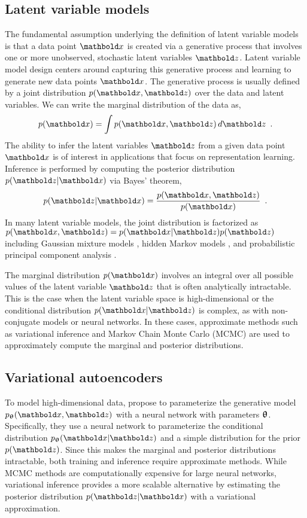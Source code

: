 \subsection{Latent variable models}
The fundamental assumption underlying the definition of latent variable models is that a data point $\xb$ is created via a generative process that involves one or more unobserved, stochastic latent variables  $\zb$. 
Latent variable model design centers around capturing this generative process and learning to generate new data points $\xb$. The generative process is usually defined by a joint distribution $p(\xb, \zb)$ over the data and latent variables. 
We can write the marginal distribution of the data as,
%
\begin{equation} \label{eq:latent-variable-model-marginal-distribution}
    p(\xb) = \int p(\xb,\zb) \, d\zb \enspace .
\end{equation}
%
The ability to infer the latent variables $\zb$ from a given data point $\xb$ is of interest in applications that focus on representation learning. Inference is performed by computing the posterior distribution $p(\zb|\xb)$ via Bayes' theorem,
%
\begin{equation} \label{eq:latent-variable-model-posterior-distribution}
    p(\zb|\xb) = \frac{p(\xb,\zb)}{p(\xb)} \enspace .
\end{equation}
%
In many latent variable models, the joint distribution is factorized as $p(\xb,\zb) = p(\xb|\zb)p(\zb)$ including Gaussian mixture models \parencite{dempster_maximum_1977}, hidden Markov models \parencite{rabiner_tutorial_1989}, and probabilistic principal component analysis \parencite{tipping_probabilistic_1999}. 

The marginal distribution $p(\xb)$ involves an integral over all possible values of the latent variable $\zb$ that is often analytically intractable. This is the case when the latent variable space is high-dimensional or the conditional distribution $p(\xb|\zb)$ is complex, as with non-conjugate models or neural networks. 
In these cases, approximate methods such as variational inference \parencite{jordan_introduction_1999} and Markov Chain Monte Carlo (MCMC) \parencite{mohamed_monte_2019} are used to approximately compute the marginal and posterior distributions. 


\subsection{Variational autoencoders} \label{sec:variational-autoencoders}
To model high-dimensional data, \textcite{kingma_autoencoding_2014,rezende_stochastic_2014} propose to parameterize the generative model $p_\thetab(\xb,\zb)$ with a neural network with parameters ${\boldsymbol{\uptheta}}$. Specifically, they use a neural network to parameterize the conditional distribution $p_\thetab(\xb|\zb)$ and a simple distribution for the prior $p(\zb)$. 
Since this makes the marginal and posterior distributions intractable, both training and inference require approximate methods. 
While MCMC methods are computationally expensive for large neural networks, variational inference provides a more scalable alternative by estimating the posterior distribution $p(\zb|\xb)$ with a variational approximation. 



